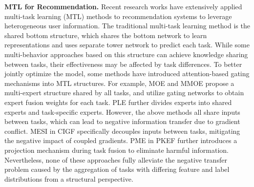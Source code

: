 \textbf{MTL for Recommendation.}
Recent research works have extensively applied multi-task learning (MTL) \cite{stem,li2020improving,moe} methods to recommendation systems to leverage heterogeneous user information. The traditional multi-task learning method is the shared bottom \cite{sharebottom} structure, which shares the bottom network to learn representations and uses separate tower network to predict each task. While some multi-behavior approaches based on this structure \cite{ghcf,crgcn,mbgmn,CML} can achieve knowledge sharing between tasks, their effectiveness may be affected by task differences. To better jointly optimize the model, some methods have introduced attention-based gating mechanisms into MTL structures. For example, MOE \cite{moe} and MMOE \cite{mmoe} propose a multi-expert structure shared by all tasks, and utilize gating networks to obtain expert fusion weights for each task. PLE \cite{PLE} further divides experts into shared experts and task-specific experts. However, the above methods all share inputs between tasks, which can lead to negative information transfer due to gradient conflict. MESI in CIGF \cite{cigf} specifically decouples inputs between tasks, mitigating the negative impact of coupled gradients. PME in PKEF \cite{pkef} further introduces a projection mechanism during task fusion to eliminate harmful information. Nevertheless, none of these approaches fully alleviate the negative transfer problem caused by the aggregation of tasks with differing feature and label distributions from a structural perspective.

